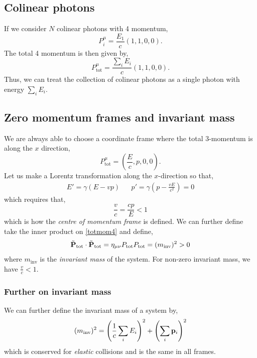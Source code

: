 \documentclass{book}
\begin{document}
\subsection{Colinear photons}
If we consider $N$ colinear photons with 4 momentum,
\begin{equation}
	P_i^{\mu} = \frac{E_1}{c}(1,1,0,0).
\end{equation}
The total 4 momentum is then given by,
\begin{equation}
	P_{\text{tot}}^{\mu} = \frac{\sum_iE_i}{c}(1,1,0,0).
\end{equation}
Thus, we can treat the collection of colinear photons as a single photon with energy $\sum_i E_i$.
\subsection{Zero momentum frames and invariant mass}
We are always able to choose a coordinate frame where the total 3-momentum is along the $x$ direction,
\begin{equation}
	P_{\text{tot}}^{\mu} = \left(\frac{E}{c}, p, 0 ,0\right). \label{totmom4}
\end{equation}
Let us make a Lorentz transformation along the $x$-direction so that,
\begin{align}
	E' = \gamma(E - vp) && p' = \gamma \left(p - \frac{vE}{c^2}\right) = 0
\end{align}
which requires that,
\begin{equation}
	\frac{v}{c} = \frac{cp}{E} < 1
\end{equation}
which is how the \textit{centre of momentum frame} is defined. We can further define take the inner product on \eqref{totmom4} and define,
\begin{equation}
	\tilde{\vb{P}}_\text{tot} \cdot \tilde{\vb{P}}_\text{tot} = \eta_{\mu\nu}P_{\text{tot}}P_{\text{tot}} = (m_{\text{inv}})^2 > 0
\end{equation}
where $m_{\text{inv}}$ is the \textit{invariant mass} of the system. For non-zero invariant mass, we have $\frac{v}{c} < 1$.
\subsubsection{Further on invariant mass}
We can further define the invariant mass of a system by,
\begin{equation}
	(m_{\text{inv}})^2 = \left(\frac{1}{c}\sum_i E_i\right)^2 + \left(\sum_i \vb{p}_i\right)^2
\end{equation}
which is conserved for \textit{elastic} collisions and is the same in all frames. 
\end{document}
